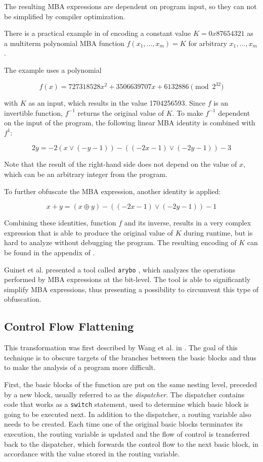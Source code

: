 \documentclass[
  digital, %
  notable,   %
  twoside, %
  nolof,     %
  nolot,     %
]{fithesis3}
\theoremstyle{definition}
\begin{document}
The resulting MBA expressions are dependent on program input, so they can not be simplified by compiler optimization. 

There is a practical example in \cite{mba_zhou} of encoding a constant value $K=0x87654321$ as a multiterm polynomial MBA function $f(x_1,...,x_m) = K$ for arbitrary $x_1,...,x_m$.

The example uses a polynomial

$$ f(x) = 727318528x^2 + 3506639707x + 6132886 \pmod{2^{32}}$$

with $K$ as an input, which results in the value 1704256593. Since $f$ is an invertible function, $f^{-1}$ returns the original value of $K$. To make $f^{-1}$ dependent on the input of the program, the following linear MBA identity is combined with $f^1$:

$$2y = -2(x \vee(-y-1))-((-2x-1)\vee(-2y-1))-3$$

Note that the result of the right-hand side does not depend on the value of $x$, which can be an arbitrary integer from the program.  

To further obfuscate the MBA expression, another identity is applied:

$$x + y = (x\oplus y) - ((-2x-1)\vee(-2y-1))-1$$

Combining these identities, function $f$ and its inverse, results in a very complex expression that is able to produce the original value of $K$ during runtime, but is hard to analyze without debugging the program. The resulting encoding of $K$ can be found in the appendix of \cite{mba_zhou}.

Guinet et al. presented a tool called \texttt{arybo} \cite{guinet_arybo}, which analyzes the operations performed by MBA expressions at the bit-level. The tool is able to significantly simplify MBA expressions, thus presenting a possibility to circumvent this type of obfuscation. 

\subsection{Control Flow Flattening} \label{flatten}

This transformation was first described by Wang et al. in \cite{wang2001protection}. The goal of this technique is to obscure targets of the branches between the basic blocks and thus to make the analysis of a program more difficult. 

First, the basic blocks of the function are put on the same nesting level, preceded by a new block, usually referred to as the \textit{dispatcher}. The dispatcher contains code that works as a \texttt{switch} statement, used to determine which basic block is going to be executed next. In addition to the dispatcher, a routing variable also needs to be created. Each time one of the original basic blocks terminates its execution, the routing variable is updated and the flow of control is transferred back to the dispatcher, which forwards the control flow to the next basic block, in accordance with the value stored in the routing variable. 
\end{document}

